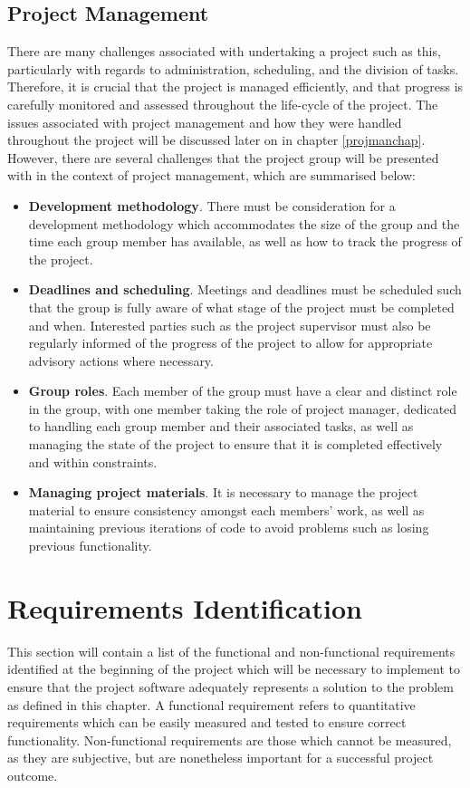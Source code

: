 \subsection{Project Management}
There are many challenges associated with undertaking a project such as this, particularly with regards to administration, scheduling, and the division of tasks. Therefore, it is crucial that the project is managed efficiently, and that progress is carefully monitored and assessed throughout the life-cycle of the project. The issues associated with project management and how they were handled throughout the project will be discussed later on in chapter \ref{projmanchap}. However, there are several challenges that the project group will be presented with in the context of project management, which are summarised below:
\begin{itemize}
\item \textbf{Development methodology}. There must be consideration for a development methodology which accommodates the size of the group and the time each group member has available, as well as how to track the progress of the project.
\item \textbf{Deadlines and scheduling}. Meetings and deadlines must be scheduled such that the group is fully aware of what stage of the project must be completed and when. Interested parties such as the project supervisor must also be regularly informed of the progress of the project to allow for appropriate advisory actions where necessary.
\item \textbf{Group roles}. Each member of the group must have a clear and distinct role in the group, with one member taking the role of project manager, dedicated to handling each group member and their associated tasks, as well as managing the state of the project to ensure that it is completed effectively and within constraints.
\item \textbf{Managing project materials}. It is necessary to manage the project material to ensure consistency amongst each members' work, as well as maintaining previous iterations of code to avoid problems such as losing previous functionality.
\end{itemize}

\section{Requirements Identification}
This section will contain a list of the functional and non-functional requirements identified at the beginning of the project which will be necessary to implement to ensure that the project software adequately represents a solution to the problem as defined in this chapter. A functional requirement refers to quantitative requirements which can be easily measured and tested to ensure correct functionality. Non-functional requirements are those which cannot be measured, as they are subjective, but are nonetheless important for a successful project outcome. 

